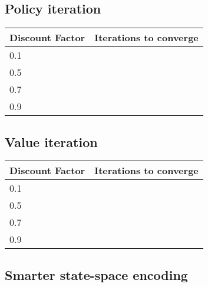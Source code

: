 \documentclass{article}
\begin{document}
\subsection*{Policy iteration}


\begin{center}
	\begin{tabular}{ l || l }
		Discount Factor & Iterations to converge \\ 
		\hline
		0.1 & \\
		0.5 & \\
		0.7 & \\
		0.9 & \\	
	\end{tabular}
\end{center}


\subsection*{Value iteration}


\begin{center}
	\begin{tabular}{ l || l }
		Discount Factor & Iterations to converge \\ 
		\hline
		0.1 & \\
		0.5 & \\
		0.7 & \\
		0.9 & \\	
	\end{tabular}
\end{center}


\subsection*{Smarter state-space encoding}




\begin{comment}
Sample table in case it's needed
\begin{center}
	\begin{tabular}{ l | l | l | l | l | l || l | l | l | l || l}
		\textbf{K} & Sampling & C-space & VocabSize & TrainSize & Kernel & Airplanes & Cars & Faces & Motorbikes & MAP \\ 
		\hline
		400 & dense & gray & 100 & 300 & linear & 87 & 74 & 95 & 69 & 81 \\
		800 & dense & gray & 100 & 300 & linear & 93 & 70 & 86 & 73 & 81 \\
		1600 & dense & gray & 100 & 300 & linear & 88 & 72 & 86 & 64 & 78 \\
		2000 & dense & gray & 100 & 300 & linear & 86 & 73 & 81 & 51 & 73 \\	
		4000 & dense & gray & 100 & 300 & linear & 90 & 75 & 83 & 53 & 75 \\	
	\end{tabular}
\end{center}

\end{comment}
\end{document}
